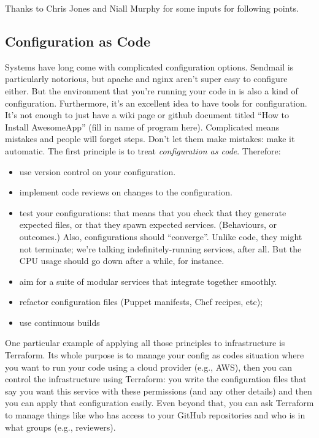 Thanks to Chris Jones and Niall Murphy for some inputs for following points.

\subsection*{Configuration as Code}
Systems have long come with complicated configuration options. 
Sendmail is particularly notorious, but apache and nginx aren't super
easy to configure either. But the environment that you're running your code in is also a kind of configuration. Furthermore, it's an excellent idea to have tools for configuration. It's not enough to just have a wiki page or github document titled ``How to Install AwesomeApp'' (fill in name of program here). Complicated means mistakes and people will forget steps. Don't let them make mistakes: make it automatic. The first principle is to treat \emph{configuration as code}. 
Therefore:
\begin{itemize}
\item use version control on your configuration.
\item implement code reviews on changes to the configuration.
\item test your configurations: that means that you check that they
  generate expected files, or that they spawn expected
  services. (Behaviours, or outcomes.) Also, configurations should
  ``converge''. Unlike code, they might not terminate; we're talking
  indefinitely-running services, after all. But the CPU usage should
  go down after a while, for instance.
\item aim for a suite of modular services that integrate together smoothly.
\item refactor configuration files (Puppet manifests, Chef recipes, etc);
\item use continuous builds
\end{itemize}

One particular example of applying all those principles to infrastructure
is Terraform. Its whole purpose is to manage your config as codes
situation where you want to run your code using a cloud provider (e.g., AWS), 
then you can control the infrastructure using Terraform: you write the
configuration files that say you want this service with these permissions
(and any other details) and then you can apply that configuration easily. 
Even beyond that, you can ask Terraform to manage things like who has access
to your GitHub repositories and who is in what groups (e.g., reviewers).

